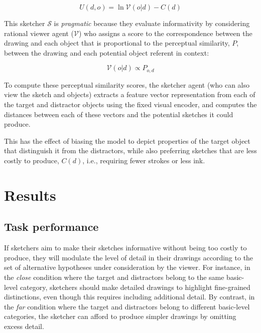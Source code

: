 \documentclass[9pt,twocolumn,twoside]{pnas-new}
\begin{document}
\begin{equation} \label{sketcher_utility}
U(d, o) = \ln \mathcal{V}(o|d) - C(d)
\end{equation}

This sketcher $\mathcal{S}$ is \emph{pragmatic} because they evaluate informativity by considering rational viewer agent ($\mathcal{V}$) who assigns a score to the correspondence between the drawing and each object that is proportional to the perceptual similarity, $P$, between the drawing and each potential object referent in context:

\begin{equation} \label{literal_viewer_score}
\mathcal{V}(o|d) \propto P_{o,d}
\end{equation}

To compute these perceptual similarity scores, the sketcher agent (who can also view the sketch and objects) extracts a feature vector representation from each of the target and distractor objects using the fixed visual encoder, and computes the distances between each of these vectors and the potential sketches it could produce. 

This has the effect of biasing the model to depict properties of the target object that distinguish it from the distractors, while also preferring sketches that are less costly to produce, $C(d)$, i.e., requiring fewer strokes or less ink.


\section*{Results}

\subsection*{Task performance}

If sketchers aim to make their sketches informative without being too costly to produce, they will modulate the level of detail in their drawings according to the set of alternative hypotheses under consideration by the viewer. For instance, in the \textit{close} condition where the target and distractors belong to the same basic-level category, sketchers should make detailed drawings to highlight fine-grained distinctions, even though this requires including additional detail. By contrast, in the \textit{far} condition where the target and distractors belong to different basic-level categories, the sketcher can afford to produce simpler drawings by omitting excess detail.
\end{document}

